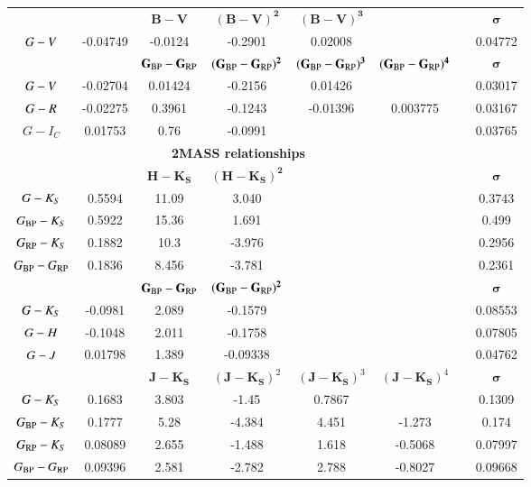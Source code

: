 \documentclass{aa}
\newcommand{\gbp}{\ensuremath{G_{\rm BP}}\xspace}
\newcommand{\grp}{\ensuremath{G_{\rm RP}}\xspace}
\newcommand{\bprp}{\ensuremath{G_{\rm BP}-G_{\rm RP}}\xspace}
\begin{document}
\begin{appendix}
\begin{table}
\begin{center}
\begin{tabular}{c c c c c c c c}
& & $\mathbf{B-V}$ & $\mathbf{(B-V)^{2}}$ & $\mathbf{(B-V)^{3}}$ &&&     $\mathbf{\sigma}$ \\  
$G-V$           & -0.04749 &-0.0124 &-0.2901 & 0.02008 &&&  0.04772\\
& & $\mathbf{\bprp}$ & $\mathbf{(\bprp)^{2}}$ & $\mathbf{(\bprp)^{3}}$ & $\mathbf{(\bprp)^{4}}$  &&  $\mathbf{\sigma}$ \\  
$G-V$           & -0.02704 & 0.01424 &-0.2156 & 0.01426 & && 0.03017\\
$G-R$           & -0.02275 & 0.3961 &-0.1243 &-0.01396 & 0.003775 && 0.03167\\
$G-I_C$           &  0.01753 & 0.76 &-0.0991 & & && 0.03765\\
\hline
\multicolumn{7}{c}{\textbf{2MASS relationships}}\\
& & $\mathbf{H-K_S}$ & $\mathbf{(H-K_S)^{2}}$ &&&&   $\mathbf{\sigma}$  \\
$G-K_S$           &  0.5594 & 11.09 &3.040 &&&&  0.3743 \\
$\gbp-K_S$          &  0.5922 & 15.36 & 1.691 &&&&  0.499\\
$\grp-K_S$          &  0.1882 & 10.3 &-3.976 &&&&  0.2956 \\
$\bprp$         &  0.1836 & 8.456 & -3.781 &&&&  0.2361 \\
& & $\mathbf{\bprp}$ & $\mathbf{(\bprp)^2}$     &&&& $\mathbf{\sigma}$ \\  
$G-K_S$           & -0.0981 & 2.089 &-0.1579   &&&& 0.08553 \\
$G-H$           & -0.1048 & 2.011 &-0.1758   &&&& 0.07805 \\
$G-J$           & 0.01798 & 1.389 &-0.09338   &&&& 0.04762\\
& & $\mathbf{J-K_S}$ & $(\mathbf{J-K_S})^{2}$ & $(\mathbf{J-K_S})^{3}$ & $(\mathbf{J-K_S})^{4}$  && $\mathbf{\sigma}$  \\
$G-K_S$         &  0.1683 & 3.803 &-1.45 & 0.7867 & && 0.1309 \\
$\gbp-K_S$        &  0.1777 & 5.28 &-4.384 & 4.451 &-1.273 && 0.174 \\
$\grp-K_S$        &  0.08089 & 2.655 &-1.488 & 1.618 &-0.5068 && 0.07997 \\
$\bprp$         &  0.09396 & 2.581 &-2.782 & 2.788 & -0.8027&& 0.09668 \\
\hline
 \end{tabular}
 \end{center}
 \end{table}


\end{appendix}
\end{document}
